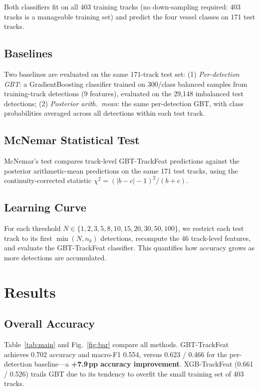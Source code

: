 \documentclass[10pt,journal,compsoc]{IEEEtran}
\begin{document}
Both classifiers fit on all 403 training tracks (no down-sampling required:
403 tracks is a manageable training set) and predict the four vessel classes
on 171 test tracks.

\subsection{Baselines}

Two baselines are evaluated on the same 171-track test set:
(1) \emph{Per-detection GBT}: a GradientBoosting classifier trained on 300/class
balanced samples from training-track detections (9 features), evaluated on the
29,148 imbalanced test detections;
(2) \emph{Posterior arith.\ mean}: the same per-detection GBT, with class
probabilities averaged across all detections within each test track.

\subsection{McNemar Statistical Test}

McNemar's test compares track-level GBT-TrackFeat predictions against the
posterior arithmetic-mean predictions on the same 171 test tracks, using
the continuity-corrected statistic $\chi^2 = (|b-c|-1)^2/(b+c)$.

\subsection{Learning Curve}

For each threshold $N \in \{1,2,3,5,8,10,15,20,30,50,100\}$, we restrict
each test track to its first $\min(N, n_k)$ detections, recompute the 46
track-level features, and evaluate the GBT-TrackFeat classifier.  This
quantifies how accuracy grows as more detections are accumulated.

\section{Results}\label{sec:results}

\subsection{Overall Accuracy}

Table~\ref{tab:main} and Fig.~\ref{fig:bar} compare all methods.
GBT-TrackFeat achieves 0.702 accuracy and macro-F1 0.554,
versus 0.623 / 0.466 for the per-detection baseline---a
\textbf{+7.9\,pp accuracy improvement}.
XGB-TrackFeat (0.661 / 0.526) trails GBT due to its tendency to
overfit the small training set of 403 tracks.
\end{document}
